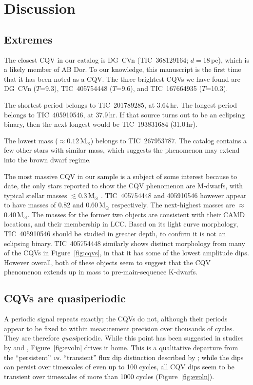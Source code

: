 \documentclass[11pt,twocolumn,tighten]{aastex63}
\begin{document}
\section{Discussion}
\label{sec:discussion}

\subsection{Extremes}
The closest CQV in our catalog is DG~CVn (TIC~368129164;
$d$$=$18\,pc), which is a likely member of AB Dor.  To our knowledge,
this manuscript is the first time that it has been noted as a CQV.
The three brightest CQVs we have found are DG~CVn ($T$=9.3),
TIC~405754448 ($T$=9.6), and TIC~167664935 ($T$=10.3).

The shortest period belongs to TIC~201789285, at 3.64\,hr.
The longest period belongs to TIC~405910546, at 37.9\,hr.  If
that source turns out to be an eclipsing binary, then the next-longest
would be TIC~193831684 (31.0\,hr).

The lowest mass ($\approx 0.12$\,M$_\odot$) belongs to TIC~267953787.
The catalog contains a few other stars with similar mass, which
suggests the phenomenon may extend into the brown dwarf regime.

The most massive CQV in our sample is a subject of some interest
because to date, the only stars reported to show the CQV phenomenon
are M-dwarfs, with typical stellar masses $\lesssim$0.3\,M$_\odot$
\citep{2022AJ....163..144G}.  TIC~405754448 and 405910546 however
appear to have masses of 0.82 and 0.60\,M$_\odot$ respectively.  The
next-highest masses are $\approx$0.40\,M$_\odot$.  The masses for the
former two objects are consistent with their CAMD locations, and their
membership in LCC.  Based on its light curve morphology, TIC~405910546
should be studied in greater depth, to confirm it is not an eclipsing
binary.  TIC~405754448 similarly shows distinct morphology from many
of the CQVs in Figure~\ref{fig:cqvs}, in that it has some of the
lowest amplitude dips.  However overall, both of these objects seem to
suggest that the CQV phenomenon extends up in mass to
pre-main-sequence K-dwarfs.


\subsection{CQVs are quasiperiodic}
A periodic signal repeats exactly; the CQVs do not, although their
periods appear to be fixed to within measurement precision over
thousands of cycles.  They are therefore {\it quasi}periodic.  While
this point has been suggested in studies by
\citet{2022AJ....163..144G} and \citet{2023ApJ...945..114P},
Figure~\ref{fig:evoln} drives it home.  This is a qualitative
departure from the ``persistent'' {\it vs.} ``transient'' flux dip
distinction described by \citet{2017AJ....153..152S};  while the dips
can persist over timescales of even up to 100 cycles, all CQV dips
seem to be transient over timescales of more than 1000 cycles
(Figure~\ref{fig:evoln}).
\end{document}
